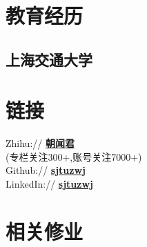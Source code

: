 \documentclass[]{deedy-resume-openfont}
\begin{document}
%
%
\lastupdated

%
%

%
%

\begin{minipage}[t]{0.25\textwidth} 


\section{教育经历} 
\sectionsep

\subsection{上海交通大学}
\sectionsep


\section{链接}
\sectionsep
Zhihu://  \href{https://zhuanlan.zhihu.com/c_1039197804748595200}{\bf 朝闻君} \\
(专栏关注300+,账号关注7000+) \\    
Github:// \href{https://github.com/sjtuzwj}{\bf sjtuzwj} \\
LinkedIn://  \href{https://www.linkedin.com/in/sjtuzwj}{\bf sjtuzwj} \\


 \section{相关修业}


\end{minipage}
\end{document}
